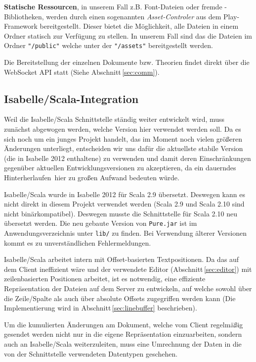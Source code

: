\textbf{Statische Ressourcen}, in unserem Fall z.B. Font-Dateien oder fremde -Bibliotheken,
werden durch einen sogenannten \textit{Asset-Controler} aus dem Play-Framework bereitgestellt.
Dieser bietet die Möglichkeit, alle Dateien in einem Ordner statisch zur Verfügung zu stellen. In
unserem Fall sind das die Dateien im Ordner \texttt{"/public"} welche unter der 
\texttt{"/assets"} bereitgestellt werden.

Die Bereitstellung der einzelnen Dokumente bzw. Theorien findet direkt über die WebSocket API statt
(Siehe Abschnitt\,\ref{sec:comm}).

\subsection{Isabelle/Scala-Integration}

Weil die Isabelle/Scala Schnittstelle ständig weiter entwickelt wird, muss zunächst abgewogen werden,
welche Version hier verwendet werden soll. Da es sich noch um ein junges Projekt handelt, das im
Moment noch vielen größeren Änderungen unterliegt, entscheiden wir uns dafür die aktuellste stabile
Version (die in Isabelle 2012 enthaltene) zu verwenden und damit deren Einschränkungen gegenüber
aktuellen Entwicklungsversionen zu akzeptieren, da ein dauerndes \glqq Hinterherlaufen\grqq\ hier zu
großen Aufwand bedeuten würde.

Isabelle/Scala wurde in Isabelle 2012 für Scala 2.9 übersetzt. Deswegen kann es nicht direkt in
diesem Projekt verwendet werden (Scala 2.9 und Scala 2.10 sind nicht binärkompatibel). Deswegen
musste die Schnittstelle für Scala 2.10 neu übersetzt werden. Die neu gebaute Version von
\texttt{Pure.jar} ist im Anwendungsverzeichnis unter \texttt{lib/} zu finden. Bei Verwendung älterer
Versionen kommt es zu unverständlichen Fehlermeldungen.

Isabelle/Scala arbeitet intern mit Offset-basierten Textpositionen. Da das auf dem Client ineffizient
wäre und der verwendete Editor (Abschnitt\,\ref{sec:editor}) mit zeilenbasierten Positionen arbeitet,
ist es notwendig, eine effiziente Repräsentation der Dateien auf dem Server zu entwickeln, auf
welche sowohl über die Zeile/Spalte als auch über absolute Offsets zugegriffen werden kann (Die
Implementierung wird in Abschnitt\,\ref{sec:linebuffer} beschrieben).

Um die kumulierten Änderungen am Dokument, welche vom Client regelmäßig gesendet werden nicht nur
in die eigene Repräsentation einzuarbeiten, sondern auch an Isabelle/Scala weiterzuleiten, muss eine
Umrechnung der Daten in die von der Schnittstelle verwendeten Datentypen geschehen.


